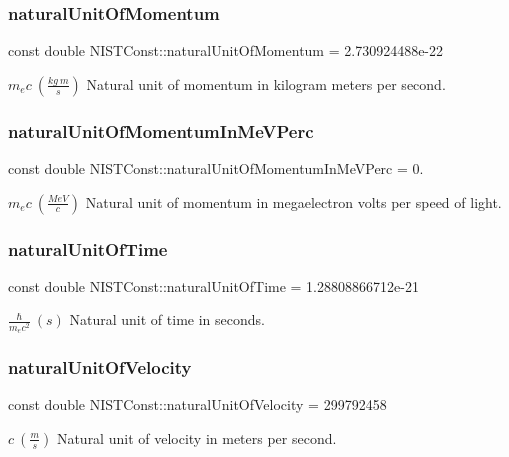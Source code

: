 \subsubsection{\texorpdfstring{natural\+Unit\+Of\+Momentum}{naturalUnitOfMomentum}}
{\footnotesize\ttfamily const double N\+I\+S\+T\+Const\+::natural\+Unit\+Of\+Momentum = 2.\+730924488e-\/22}

$m_e c \ (\frac{kg\ m}{s})$ Natural unit of momentum in kilogram meters per second. \mbox{\label{group___natural_unit_ga4ac7dedeaf24fa9d4baa8331a85ab4ca}} 
\subsubsection{\texorpdfstring{natural\+Unit\+Of\+Momentum\+In\+Me\+V\+Perc}{naturalUnitOfMomentumInMeVPerc}}
{\footnotesize\ttfamily const double N\+I\+S\+T\+Const\+::natural\+Unit\+Of\+Momentum\+In\+Me\+V\+Perc = 0.}

$m_e c \ (\frac{MeV}{c})$ Natural unit of momentum in megaelectron volts per speed of light. \mbox{\label{group___natural_unit_ga20f1d962c5213c24d1350ee6a64e3a67}} 
\subsubsection{\texorpdfstring{natural\+Unit\+Of\+Time}{naturalUnitOfTime}}
{\footnotesize\ttfamily const double N\+I\+S\+T\+Const\+::natural\+Unit\+Of\+Time = 1.\+28808866712e-\/21}

$\frac{\hbar}{m_e c^2} \ (s)$ Natural unit of time in seconds. \mbox{\label{group___natural_unit_ga4dcc4091af025cbd895e8bea1e265c32}} 
\subsubsection{\texorpdfstring{natural\+Unit\+Of\+Velocity}{naturalUnitOfVelocity}}
{\footnotesize\ttfamily const double N\+I\+S\+T\+Const\+::natural\+Unit\+Of\+Velocity = 299792458}

$c \ (\frac{m}{s})$ Natural unit of velocity in meters per second. 